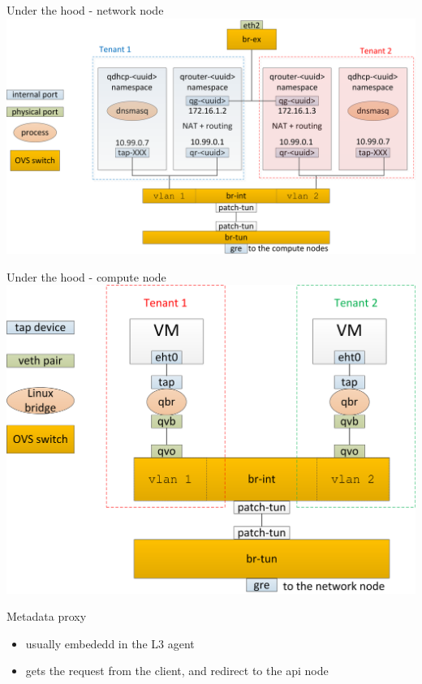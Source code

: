 \documentclass[english,serif,mathserif,xcolor=pdftex,dvipsnames,table]{beamer}
\begin{document}
\begin{frame}{Under the hood - network node}
  \includegraphics[width=\linewidth]{under-the-hood-neutron-server}
\end{frame}

\begin{frame}
  {Under the hood - compute node}
  \includegraphics[width=\linewidth]{under-the-hood-compute}
\end{frame}


\begin{frame}
  {Metadata proxy}

  \begin{itemize}
  \item usually embededd in the L3 agent

  \item gets the request from the client, and redirect to the api node
  \end{itemize}
\end{frame}
\end{document}
